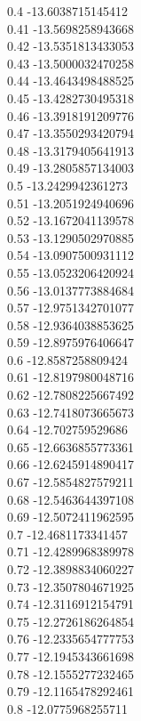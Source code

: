 {0.4	-13.6038715145412\\
0.41	-13.5698258943668\\
0.42	-13.5351813433053\\
0.43	-13.5000032470258\\
0.44	-13.4643498488525\\
0.45	-13.4282730495318\\
0.46	-13.3918191209776\\
0.47	-13.3550293420794\\
0.48	-13.3179405641913\\
0.49	-13.2805857134003\\
0.5	-13.2429942361273\\
0.51	-13.2051924940696\\
0.52	-13.1672041139578\\
0.53	-13.1290502970885\\
0.54	-13.0907500931112\\
0.55	-13.0523206420924\\
0.56	-13.0137773884684\\
0.57	-12.9751342701077\\
0.58	-12.9364038853625\\
0.59	-12.8975976406647\\
0.6	-12.8587258809424\\
0.61	-12.8197980048716\\
0.62	-12.7808225667492\\
0.63	-12.7418073665673\\
0.64	-12.702759529686\\
0.65	-12.6636855773361\\
0.66	-12.6245914890417\\
0.67	-12.5854827579211\\
0.68	-12.5463644397108\\
0.69	-12.5072411962595\\
0.7	-12.4681173341457\\
0.71	-12.4289968389978\\
0.72	-12.3898834060227\\
0.73	-12.3507804671925\\
0.74	-12.3116912154791\\
0.75	-12.2726186264854\\
0.76	-12.2335654777753\\
0.77	-12.1945343661698\\
0.78	-12.1555277232465\\
0.79	-12.1165478292461\\
0.8	-12.0775968255711\\
}
